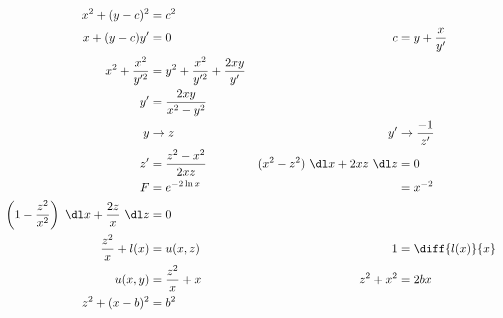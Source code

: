 \begin{enumerate}
          \begin{align}
              x^{2} + (y-c)^{2}                   & = c^{2}                          \\
              x + (y-c)y'                         & = 0                            &
              c                                   & =  y + \frac{x}{y'}              \\
              x^{2}  + \frac{x^{2}}{y'^{2}}       & = y^{2} + \frac{x^{2}}{y'^{2}}
              + \frac{2xy}{y'}                                                       \\
              y'                                  & = \frac{2xy}{x^{2} - y^{2}}      \\
              y                                   & \to z                          &
              y'                                  & \to \frac{-1}{z'}                \\
              z'                                  & = \frac{z^{2} - x^{2}}{2xz}    &
              (x^{2} - z^{2})\ \dl x + 2xz\ \dl z & = 0                              \\
              F                                   & = e^{-2\ln x}                  &
                                                  & = x^{-2}                         \\
              \left( 1 - \frac{z^{2}}{x^{2}}\right)\ \dl x + \frac{2z}{x}\ \dl z
                                                  & = 0                              \\
              \frac{z^{2}}{x} + l(x)              & = u(x, z)                      &
              1                                   & = \diff{l(x)}{x}                 \\
              u(x, y)                             & = \frac{z^{2}}{x} + x          &
              z^{2} + x^{2}                       & = 2bx                            \\
              z^{2} + (x - b)^{2}                 & = b^{2}
          \end{align}


\end{enumerate}
